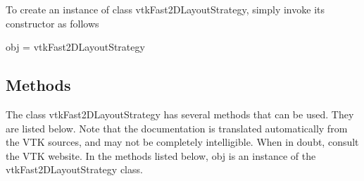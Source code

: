To create an instance of class vtk\-Fast2\-D\-Layout\-Strategy, simply invoke its constructor as follows \begin{DoxyVerb}  obj = vtkFast2DLayoutStrategy
\end{DoxyVerb}
 \hypertarget{vtkwidgets_vtkxyplotwidget_Methods}{}\subsection{Methods}\label{vtkwidgets_vtkxyplotwidget_Methods}
The class vtk\-Fast2\-D\-Layout\-Strategy has several methods that can be used. They are listed below. Note that the documentation is translated automatically from the V\-T\-K sources, and may not be completely intelligible. When in doubt, consult the V\-T\-K website. In the methods listed below, {\ttfamily obj} is an instance of the vtk\-Fast2\-D\-Layout\-Strategy class. 
